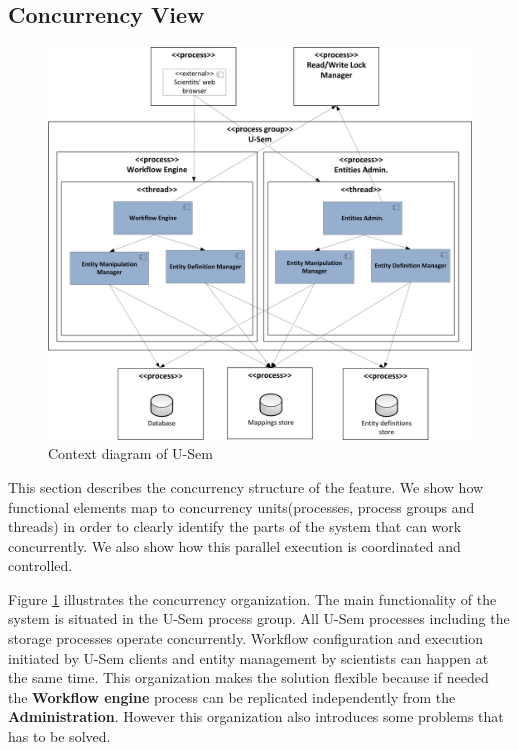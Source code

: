 \subsection{Concurrency View}

\begin{figure}[h!]
  \centering
  	\includegraphics[scale=0.5]{storage/functional/concur.png}
  \caption{Context diagram of U-Sem }
  \label{fig:storageConc}
\end{figure}

This section describes the concurrency structure of the feature. We show how functional elements map to concurrency units(processes, process groups and threads) in order to clearly identify the parts of the system that can work concurrently. We also show how this parallel execution is coordinated and controlled.

Figure \ref{fig:storageConc} illustrates the concurrency organization. The main functionality of the system is situated in the U-Sem process group. All U-Sem processes including the storage processes operate concurrently. Workflow configuration and execution initiated by U-Sem clients and entity management by scientists can happen at the same time. This organization makes the solution flexible because if needed the \textbf{Workflow engine} process can be replicated independently from the \textbf{Administration}. However this organization also introduces some problems that has to be solved.

